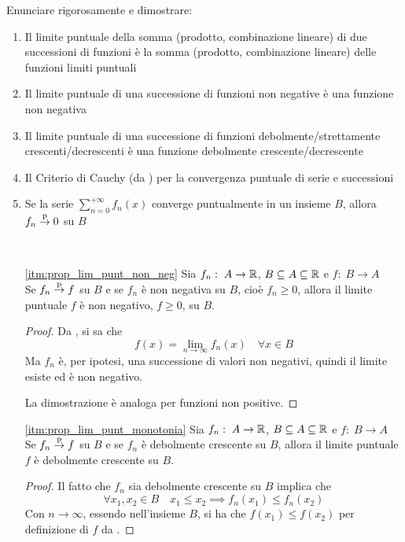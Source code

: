 \begin{exercise}
	\label{ex:dim_prop_lim_conv_punt}
	Enunciare rigorosamente e dimostrare:
	\begin{enumerate}
		\item Il limite puntuale della somma (prodotto, combinazione lineare) di due successioni di funzioni è la somma (prodotto, combinazione lineare) delle funzioni limiti puntuali
		\item \label{itm:prop_lim_punt_non_neg} Il limite puntuale di una successione di funzioni non negative è una funzione non negativa
		\item \label{itm:prop_lim_punt_monotonia} Il limite puntuale di una successione di funzioni debolmente/strettamente crescenti/decrescenti è una funzione debolmente crescente/decrescente
		\item Il Criterio di Cauchy (da ) per la convergenza puntuale di serie e successioni
		\item Se la serie $\sum\limits_{n = 0}^{+\infty} f_n(x)$ converge puntualmente in un insieme $B$, allora $f_n \overset{\text{p}}{\to} 0$ su $B$
	\end{enumerate}
	\begin{solution}~
		\renewcommand\qedsymbol{$\square$} %
		\begin{enumerate}
			\item[\ref*{itm:prop_lim_punt_non_neg}]
				Sia $f_n:\; A \to \mathbb{R}$, $B \subseteq A \subseteq \mathbb{R}$ e $f:\; B \to A$\\
				Se $f_n \overset{\text{p}}{\to} f$ su $B$ e se $f_n$ è non negativa su $B$, cioè $f_n \geq 0$, allora il limite puntuale $f$ è non negativo, $f \geq 0$, su $B$.
				\begin{proof}
					Da , si sa che
					\[f(x) = \lim\limits_{n \to \infty} f_n(x) \quad \forall x \in B\]
					Ma $f_n$ è, per ipotesi, una successione di valori non negativi, quindi il limite esiste ed è non negativo.

					La dimostrazione è analoga per funzioni non positive.
				\end{proof}
			\item[\ref*{itm:prop_lim_punt_monotonia}]
				Sia $f_n:\; A \to \mathbb{R}$, $B \subseteq A \subseteq \mathbb{R}$ e $f:\; B \to A$\\
				Se $f_n \overset{\text{p}}{\to} f$ su $B$ e se $f_n$ è debolmente crescente su $B$, allora il limite puntuale $f$ è debolmente crescente su $B$.
				\begin{proof}
					Il fatto che $f_n$ sia debolmente crescente su $B$ implica che
					\[\forall x_1, x_2 \in B \quad x_1 \leq x_2 \implies f_n(x_1) \leq f_n(x_2)\]
					Con $n \to \infty$, essendo nell'insieme $B$, si ha che $f(x_1) \leq f(x_2)$ per definizione di $f$ da .


\end{proof}
\end{enumerate}
\end{solution}
\end{exercise}
